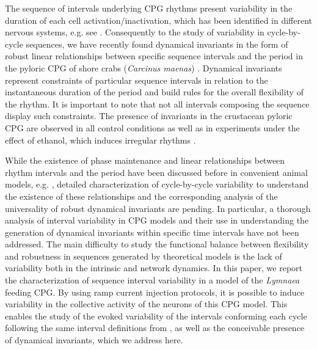 The sequence of intervals underlying CPG rhythms present variability in the duration of each cell activation/inactivation, which has been identified in different nervous systems, e.g. see \cite{Reyes2008,Elliott1991,Martinez2019}. Consequently to the study of variability in cycle-by-cycle sequences, we have recently found dynamical invariants in the form of robust linear relationships between specific sequence intervals and the period in the  pyloric CPG of shore crabs (\textit{Carcinus maenas}) \cite{Elices2019}. Dynamical invariants represent constraints of particular sequence intervals in relation to the instantaneous duration of the period and build rules for the overall flexibility of the rhythm. It is important to note that not all intervals composing the sequence display such constraints. The presence of invariants in the crustacean pyloric CPG are observed in all control conditions as well as in experiments under the effect of ethanol, which induces irregular rhythms \cite{Elices2019}. 



While the existence of phase maintenance and linear relationships between rhythm intervals and the period have been discussed before in convenient animal models, e.g. \cite{Grillner1976,Hooper1997a,Vavoulis2007}, detailed characterization of cycle-by-cycle variability to understand the existence of these relationships and the corresponding analysis of the universality of robust dynamical invariants are pending.
In particular, a thorough analysis of interval variability in CPG models and their use in understanding the generation of dynamical invariants within specific time intervals have not been addressed. The main difficulty to study the functional balance between flexibility and robustness in sequences generated by theoretical models is the lack of variability both in the intrinsic and network dynamics. In this paper, we report the characterization of sequence interval variability in a model of the \textit{Lymnaea} feeding CPG.  By using ramp current injection protocols, it is possible to induce variability in the collective activity of the neurons of this CPG model. This enables the study of the evoked variability of the intervals conforming each cycle following the same interval definitions from \cite{Elices2019}, as well as the conceivable presence of dynamical invariants, which we address here. 

